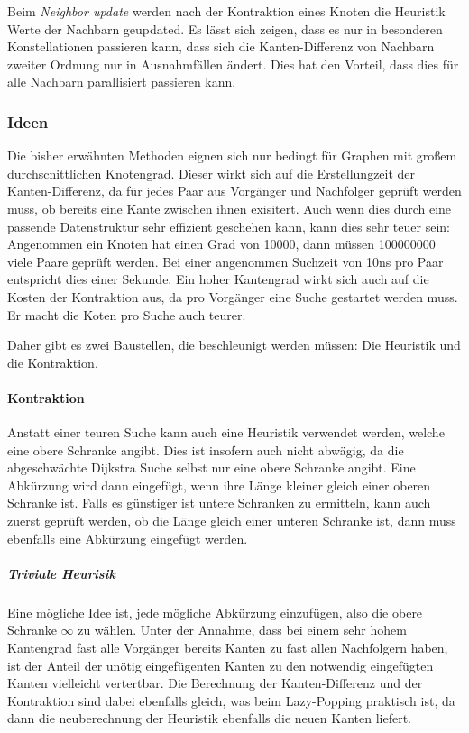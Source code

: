 Beim \emph{Neighbor update} werden nach der Kontraktion eines Knoten die Heuristik Werte der Nachbarn geupdated.
Es lässt sich zeigen, dass es nur in besonderen Konstellationen passieren kann, dass sich die Kanten-Differenz von Nachbarn zweiter Ordnung nur in Ausnahmfällen ändert. 
Dies hat den Vorteil, dass dies für alle Nachbarn parallisiert passieren kann.

\subsubsection{Ideen}

Die bisher erwähnten Methoden eignen sich nur bedingt für Graphen mit großem durchscnittlichen Knotengrad.
Dieser wirkt sich auf die Erstellungzeit der Kanten-Differenz, da für jedes Paar aus Vorgänger und Nachfolger geprüft werden muss, ob bereits eine Kante zwischen ihnen exisitert.
Auch wenn dies durch eine passende Datenstruktur sehr effizient geschehen kann, kann dies sehr teuer sein:
Angenommen ein Knoten hat einen Grad von \num{10000}, dann müssen \num{100000000} viele Paare geprüft werden.
Bei einer angenommen Suchzeit von \num{10}\unit{\ns} pro Paar entspricht dies einer Sekunde.
Ein hoher Kantengrad wirkt sich auch auf die Kosten der Kontraktion aus, da pro Vorgänger eine Suche gestartet werden muss.
Er macht die Koten pro Suche auch teurer.

Daher gibt es zwei Baustellen, die beschleunigt werden müssen:
Die Heuristik und die Kontraktion.

\paragraph{Kontraktion}
Anstatt einer teuren Suche kann auch eine Heuristik verwendet werden, welche eine obere Schranke angibt.
Dies ist insofern auch nicht abwägig, da die abgeschwächte Dijkstra Suche selbst nur eine obere Schranke angibt.
Eine Abkürzung wird dann eingefügt, wenn ihre Länge kleiner gleich einer oberen Schranke ist.
Falls es günstiger ist untere Schranken zu ermitteln, kann auch zuerst geprüft werden, ob die Länge gleich einer unteren Schranke ist, dann muss ebenfalls eine Abkürzung eingefügt werden.

\subparagraph{Triviale Heurisik}
Eine mögliche Idee ist, jede mögliche Abkürzung einzufügen, also die obere Schranke $\infty$ zu wählen.
Unter der Annahme, dass bei einem sehr hohem Kantengrad fast alle Vorgänger bereits Kanten zu fast allen Nachfolgern haben, ist der Anteil der unötig eingefügenten Kanten zu den notwendig eingefügten Kanten vielleicht vertertbar.
Die Berechnung der Kanten-Differenz und der Kontraktion sind dabei ebenfalls gleich, was beim Lazy-Popping praktisch ist, da dann die neuberechnung der Heuristik ebenfalls die neuen Kanten liefert.

